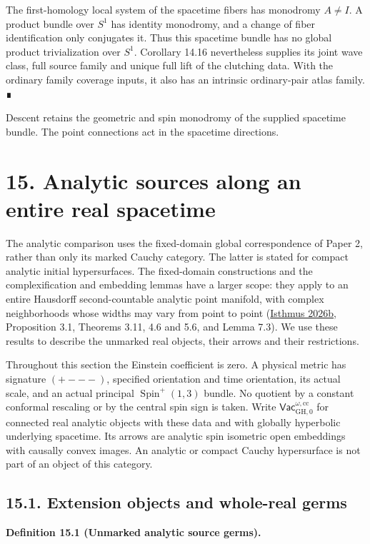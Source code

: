 \documentclass[
  english,
  11pt,
  reqno]{amsart}
\makeatletter
\newcommand{\paperdisplaynext}{%
  \let\paper@savedstartsection\@startsection
  \def\@startsection##1##2##3##4##5##6{%
    \let\@startsection\paper@savedstartsection
    \@tempskipa ##5\relax
    \ifdim\@tempskipa<\z@
      \def\paper@afterskip{.35\baselineskip}%
    \else
      \def\paper@afterskip{##5}%
    \fi
    \@startsection{##1}{##2}{##3}{##4}{\paper@afterskip}{##6}}}
\newcommand{\paperdisplaysection}{\paperdisplaynext\subsection}
\newcommand{\pandocstatementheading}[1]{%
  \par\if@nobreak\else
    \addpenalty{\@beginparpenalty}%
    \addvspace{.5\baselineskip plus .2\baselineskip minus .2\baselineskip}%
  \fi
  {\normalfont\bfseries #1\par}%
  \nobreak\@afterindenttrue\@afterheading
}
\makeatother
\begin{document}
The first-homology local system of the spacetime fibers has monodromy
\(A\ne I\). A product bundle over \(S^1\) has identity monodromy, and a
change of fiber identification only conjugates it. Thus this spacetime
bundle has no global product trivialization over \(S^1\). Corollary
14.16 nevertheless supplies its joint wave class, full source family and
unique full lift of the clutching data. With the ordinary family
coverage inputs, it also has an intrinsic ordinary-pair atlas family. ∎

Descent retains the geometric and spin monodromy of the supplied
spacetime bundle. The point connections act in the spacetime directions.

\protect{}\label{sec:global-analytic-real-germs}

\section{15. Analytic sources along an entire real
spacetime}\label{analytic-sources-along-an-entire-real-spacetime}

The analytic comparison uses the fixed-domain global correspondence of
Paper 2, rather than only its marked Cauchy category. The latter is
stated for compact analytic initial hypersurfaces. The fixed-domain
constructions and the complexification and embedding lemmas have a
larger scope: they apply to an entire Hausdorff second-countable
analytic point manifold, with complex neighborhoods whose widths may
vary from point to point (\hyperref[ref-IsthmusGlobal2026]{Isthmus
2026b}, Proposition 3.1, Theorems 3.11, 4.6 and 5.6, and Lemma 7.3). We
use these results to describe the unmarked real objects, their arrows
and their restrictions.

Throughout this section the Einstein coefficient is zero. A physical
metric has signature \((+---)\), specified orientation and time
orientation, its actual scale, and an actual principal
\(\operatorname{Spin}^{+}(1,3)\) bundle. No quotient by a constant
conformal rescaling or by the central spin sign is taken. Write
\(\mathsf{Vac}^{\omega,\mathrm{cc}}_{\mathrm{GH},0}\) for connected real
analytic objects with these data and with globally hyperbolic underlying
spacetime. Its arrows are analytic spin isometric open embeddings with
causally convex images. An analytic or compact Cauchy hypersurface is
not part of an object of this category.

\protect{}\label{sec:unmarked-analytic-source-category}
\paperdisplaysection{15.1. Extension objects and whole-real
germs}\label{extension-objects-and-whole-real-germs}
\pandocstatementheading{\protect{}\label{def:unmarked-analytic-source-germs}Definition 15.1 (Unmarked analytic source germs).}
\end{document}
